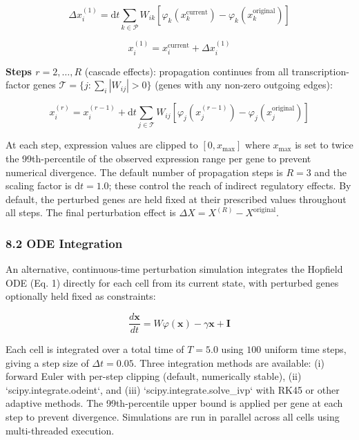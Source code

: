 \documentclass[11pt]{article}
\begin{document}
\begin{equation}
\Delta x_i^{(1)} = \mathrm{d}t \sum_{k \in \mathcal{P}} W_{ik}\left[\varphi_k\!\left(x_k^{\text{current}}\right) - \varphi_k\!\left(x_k^{\text{original}}\right)\right] 
\end{equation}



\begin{equation}
x_i^{(1)} = x_i^{\text{current}} + \Delta x_i^{(1)} 
\end{equation}


\textbf{Steps $r = 2,\ldots,R$} (cascade effects): propagation continues from all transcription-factor genes $\mathcal{T} = \{j : \sum_i |W_{ij}| > 0\}$ (genes with any non-zero outgoing edges):

\begin{equation}
x_i^{(r)} = x_i^{(r-1)} + \mathrm{d}t \sum_{j \in \mathcal{T}} W_{ij}\left[\varphi_j\!\left(x_j^{(r-1)}\right) - \varphi_j\!\left(x_j^{\text{original}}\right)\right] 
\end{equation}


At each step, expression values are clipped to $[0, x_{\max}]$ where $x_{\max}$ is set to twice the 99th-percentile of the observed expression range per gene to prevent numerical divergence. The default number of propagation steps is $R = 3$ and the scaling factor is $\mathrm{d}t = 1.0$; these control the reach of indirect regulatory effects. By default, the perturbed genes are held fixed at their prescribed values throughout all steps. The final perturbation effect is $\Delta X = X^{(R)} - X^{\text{original}}$.


\subsubsection*{8.2 ODE Integration}

An alternative, continuous-time perturbation simulation integrates the Hopfield ODE (Eq. 1) directly for each cell from its current state, with perturbed genes optionally held fixed as constraints:


\begin{equation}
\frac{d\mathbf{x}}{dt} = W\varphi(\mathbf{x}) - \gamma\mathbf{x} + \mathbf{I}
\end{equation}


Each cell is integrated over a total time of $T = 5.0$ using $100$ uniform time steps, giving a step size of $\Delta t = 0.05$. Three integration methods are available: (i) forward Euler with per-step clipping (default, numerically stable), (ii) `scipy.integrate.odeint`, and (iii) `scipy.integrate.solve\_ivp` with RK45 or other adaptive methods. The 99th-percentile upper bound is applied per gene at each step to prevent divergence. Simulations are run in parallel across all cells using multi-threaded execution.
\end{document}
